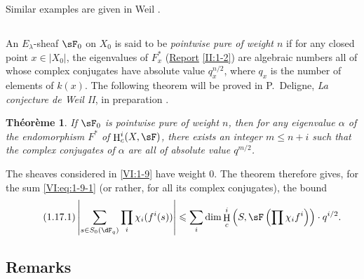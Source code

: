 \documentclass[oneside]{book}
\DeclareMathOperator{\h}{H}
\theoremstyle{sga-source}
\theoremstyle{sga-source-dash}
\theoremstyle{sga-source-dotdash}
\theoremstyle{sga-source-number-note-dash}
\theoremstyle{sga-source-note-number-dotdash}
\theoremstyle{sga-source-example-dotdash}
\theoremstyle{sga-source-inline-number}
\theoremstyle{sga-source-bare-number}
\theoremstyle{sga-source}
\newtheorem{theorem_}[subsection]{Théorème}
\newcommand{\PrintPage}[1]{}\newcommand{\MathPage}[1]{}\newcommand{\PrintCite}[2]{#1}\newcommand{\var}[3]{#1}
\begin{document}
Similar examples are given in Weil \cite[App V, 3rd ed.]{we74}. 





\subsection{}\label{VI:1-16}

An $E_\lambda$-sheaf $\sF_0$ on $X_0$ is said to be \emph{pointwise pure of 
weight $n$} if for any closed point $x\in |X_0|$, the eigenvalues of 
$F_x^\ast$ (\hyperref[II]{Report} \ref{II:1-2}) are algebraic numbers 
all of whose complex conjugates have absolute value 
$q_x^{n/2}$, where $q_x$ is the number of elements of $k(x)$. The 
following theorem will be proved in P.~Deligne, \emph{La conjecture de Weil II}, in preparation \cite{de80}. 





\PrintPage{178}
\begin{theorem_}\label{VI:1-17}
If $\sF_0$ is pointwise pure of weight $n$, then for any eigenvalue $\alpha$ 
of the endomorphism $F^\ast$ of $\h_c^i(X,\sF)$, there exists an integer 
$m\leqslant n+i$ such that the complex conjugates of $\alpha$ are all of 
absolute value $q^{m/2}$.
\end{theorem_}

The sheaves considered in \ref{VI:1-9} have weight $0$. The theorem 
therefore gives, for the sum \ref{VI:eq:1-9-1} (or rather, for all its 
complex conjugates), the bound 
\begin{equation*}\tag{1.17.1}\label{VI:eq:1-17-1}
  \left|\sum_{s\in S_0(\dF_q)} \prod_i \chi_i(f^i(s)) \right| \leqslant \sum_i \dim \h_c^i\left(S,\sF\left(\prod \chi_i f^i\right)\right)\cdot q^{i/2} \text{.}
\end{equation*}





\subsection{Remarks}\label{VI:1-18}
\end{document}
